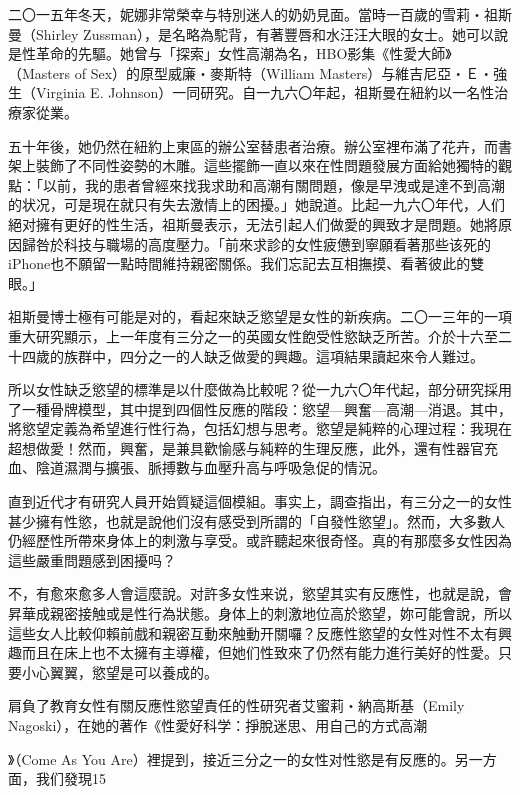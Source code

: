\documentclass[12pt,UTF8]{ctexbook}
\begin{document}
二〇一五年冬天，妮娜非常榮幸与特別迷人的奶奶見面。當時一百歲的雪莉‧祖斯曼（Shirley Zussman），是名略為駝背，有著豐唇和水汪汪大眼的女士。她可以說是性革命的先驅。她曾与「探索」女性高潮為名，HBO影集《性愛大師》（Masters of Sex）的原型威廉‧麥斯特（William Masters）与維吉尼亞‧Ｅ‧強生（Virginia E. Johnson）一同研究。自一九六〇年起，祖斯曼在紐約以一名性治療家從業。

五十年後，她仍然在紐約上東區的辦公室替患者治療。辦公室裡布滿了花卉，而書架上裝飾了不同性姿勢的木雕。這些擺飾一直以來在性問題發展方面給她獨特的觀點：「以前，我的患者曾經來找我求助和高潮有關問題，像是早洩或是達不到高潮的状况，可是現在就只有失去激情上的困擾。」她說道。比起一九六〇年代，人们絕对擁有更好的性生活，祖斯曼表示，无法引起人们做愛的興致才是問題。她將原因歸咎於科技与職場的高度壓力。「前來求診的女性疲憊到寧願看著那些该死的iPhone也不願留一點時間維持親密關係。我们忘記去互相撫摸、看著彼此的雙眼。」

祖斯曼博士極有可能是对的，看起來缺乏慾望是女性的新疾病。二〇一三年的一項重大研究顯示，上一年度有三分之一的英國女性飽受性慾缺乏所苦。介於十六至二十四歲的族群中，四分之一的人缺乏做愛的興趣。這項結果讀起來令人難过。

所以女性缺乏慾望的標準是以什麼做為比較呢？從一九六〇年代起，部分研究採用了一種骨牌模型，其中提到四個性反應的階段：慾望—興奮—高潮—消退。其中，將慾望定義為希望進行性行為，包括幻想与思考。慾望是純粹的心理过程：我現在超想做愛！然而，興奮，是兼具歡愉感与純粹的生理反應，此外，還有性器官充血、陰道濕潤与擴張、脈搏數与血壓升高与呼吸急促的情況。

直到近代才有研究人員开始質疑這個模組。事实上，調查指出，有三分之一的女性甚少擁有性慾，也就是說他们沒有感受到所謂的「自發性慾望」。然而，大多數人仍經歷性所帶來身体上的刺激与享受。或許聽起來很奇怪。真的有那麼多女性因為這些嚴重問題感到困擾吗？





不，有愈來愈多人會這麼說。对許多女性来说，慾望其实有反應性，也就是說，會昇華成親密接触或是性行為狀態。身体上的刺激地位高於慾望，妳可能會說，所以這些女人比較仰賴前戲和親密互動來触動开關囉？反應性慾望的女性对性不太有興趣而且在床上也不太擁有主導權，但她们性致來了仍然有能力進行美好的性愛。只要小心翼翼，慾望是可以養成的。

肩負了教育女性有關反應性慾望責任的性研究者艾蜜莉‧納高斯基（Emily Nagoski），在她的著作《性愛好科学：掙脫迷思、用自己的方式高潮

》（Come As You Are）裡提到，接近三分之一的女性对性慾是有反應的。另一方面，我们發現15%
\end{document}
